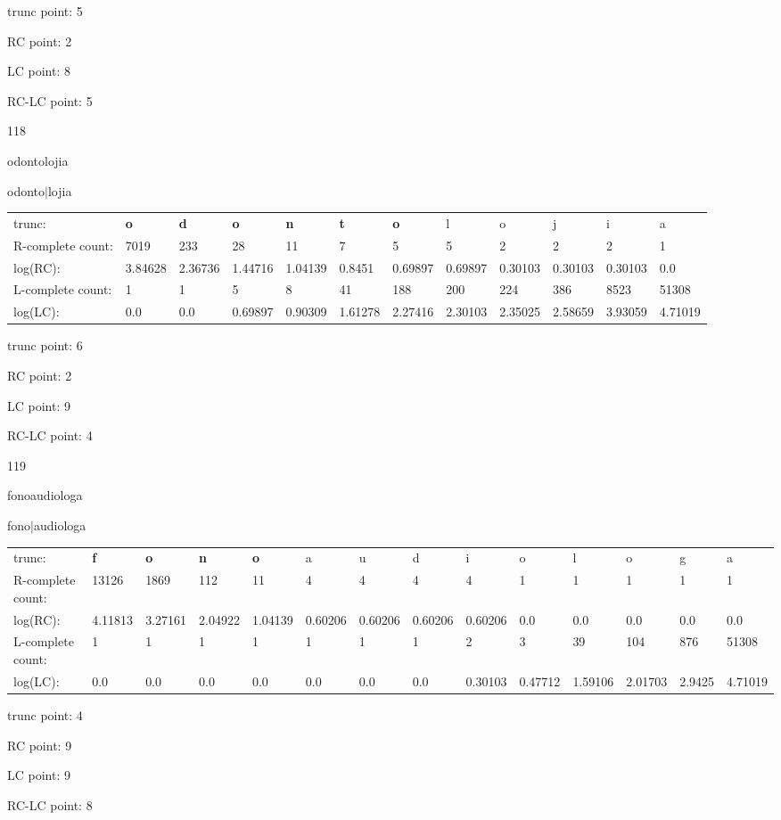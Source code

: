 \documentclass{article}
\begin{document}
trunc point: 5

RC point: 2

LC point: 8

RC-LC point: 5

\vspace{3em}



118

odontolojia

odonto$|$lojia

\vspace{1em}

\begin{tabular}{l|lllllllllll}

trunc: & {\color{red}\bf o} & {\color{red}\bf d} & {\color{red}\bf o} & {\color{red}\bf n} & {\color{red}\bf t} & {\color{red}\bf o} & l & o & j & i & a \\ 
R-complete count: & 7019 & 233 & 28 & 11 & 7 & 5 & 5 & 2 & 2 & 2 & 1 \\ 
log(RC): & 3.84628 & 2.36736 & 1.44716 & 1.04139 & 0.8451 & 0.69897 & 0.69897 & 0.30103 & 0.30103 & 0.30103 & 0.0 \\ 
L-complete count: & 1 & 1 & 5 & 8 & 41 & 188 & 200 & 224 & 386 & 8523 & 51308 \\ 
log(LC): & 0.0 & 0.0 & 0.69897 & 0.90309 & 1.61278 & 2.27416 & 2.30103 & 2.35025 & 2.58659 & 3.93059 & 4.71019 \\ 
\end{tabular}

trunc point: 6

RC point: 2

LC point: 9

RC-LC point: 4

\vspace{3em}



119

fonoaudiologa

fono$|$audiologa

\vspace{1em}

\begin{tabular}{l|lllllllllllll}

trunc: & {\color{red}\bf f} & {\color{red}\bf o} & {\color{red}\bf n} & {\color{red}\bf o} & a & u & d & i & o & l & o & g & a \\ 
R-complete count: & 13126 & 1869 & 112 & 11 & 4 & 4 & 4 & 4 & 1 & 1 & 1 & 1 & 1 \\ 
log(RC): & 4.11813 & 3.27161 & 2.04922 & 1.04139 & 0.60206 & 0.60206 & 0.60206 & 0.60206 & 0.0 & 0.0 & 0.0 & 0.0 & 0.0 \\ 
L-complete count: & 1 & 1 & 1 & 1 & 1 & 1 & 1 & 2 & 3 & 39 & 104 & 876 & 51308 \\ 
log(LC): & 0.0 & 0.0 & 0.0 & 0.0 & 0.0 & 0.0 & 0.0 & 0.30103 & 0.47712 & 1.59106 & 2.01703 & 2.9425 & 4.71019 \\ 
\end{tabular}

trunc point: 4

RC point: 9

LC point: 9

RC-LC point: 8

\vspace{3em}
\end{document}
